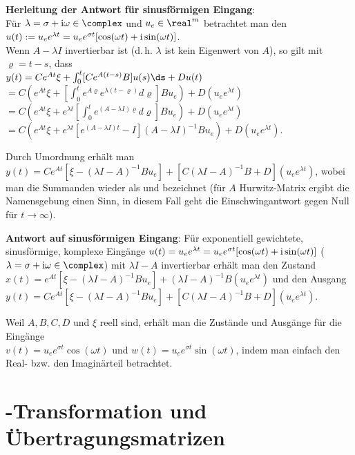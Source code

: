 \textbf{Herleitung der Antwort für sinusförmigen Eingang}:\\
Für $\lambda = \sigma + \iu\omega \in \complex$ und $u_e \in \real^m$ betrachtet man den \\
$u(t) := u_e e^{\lambda t} = u_e e^{\sigma t} [\cos(\omega t) + \text{i} \sin(\omega t)]$.\\
Wenn $A - \lambda I$ invertierbar ist (d.\,h. $\lambda$ ist kein Eigenwert von $A$), so gilt
mit $\varrho = t - s$, dass\\
$y(t) = Ce^{At} \xi + \int_0^t [Ce^{A(t - s)} B]u(s) \ds + Du(t)$\\
$= C \left(e^{At} \xi +
\left[\int_0^t e^{A\varrho} e^{\lambda (t - \varrho)} d\varrho\right] Bu_e\right) +
D (u_e e^{\lambda t})$\\
$= C \left(e^{At} \xi + e^{\lambda t}
\left[\int_0^t e^{(A - \lambda I) \varrho} d\varrho\right] Bu_e\right) + D (u_e e^{\lambda t})$\\
$= C \left(e^{At} \xi +
e^{\lambda t} \left[e^{(A - \lambda I)t} - I\right] (A - \lambda I)^{-1} B u_e\right) +
D (u_e e^{\lambda t})$.

Durch Umordnung erhält man
$y(t) = Ce^{At} [\xi - (\lambda I - A)^{-1} Bu_e] +
[C (\lambda I - A)^{-1} B + D] (u_e e^{\lambda t})$,
wobei man die Summanden wieder als  und 
bezeichnet
(für $A$ Hurwitz-Matrix ergibt die Namensgebung einen Sinn, in diesem Fall geht die
Einschwingantwort gegen Null für $t \to \infty$).

\textbf{Antwort auf sinusförmigen Eingang}:
Für exponentiell gewichtete, sinusförmige, komplexe Eingänge
$u(t) = u_e e^{\lambda t} = u_e e^{\sigma t} [\cos(\omega t) + \text{i} \sin(\omega t)]$
($\lambda = \sigma + \iu \omega \in \complex$) mit $\lambda I - A$ invertierbar erhält man den
Zustand $x(t) = e^{At} [\xi - (\lambda I - A)^{-1} Bu_e] +
(\lambda I - A)^{-1} B (u_e e^{\lambda t})$ und den Ausgang
$y(t) = C e^{At} [\xi - (\lambda I - A)^{-1} Bu_e] +
[C (\lambda I - A)^{-1} B + D] (u_e e^{\lambda t})$.

Weil $A, B, C, D$ und $\xi$ reell sind, erhält man die Zustände und Ausgänge für
die Eingänge\\
$v(t) = u_e e^{\sigma t} \cos(\omega t)$ und $w(t) = u_e e^{\sigma t} \sin(\omega t)$,
indem man einfach den Real- bzw. den Imaginärteil betrachtet.

\pagebreak

\section{%
    -Transformation und Übertragungsmatrizen%
}

